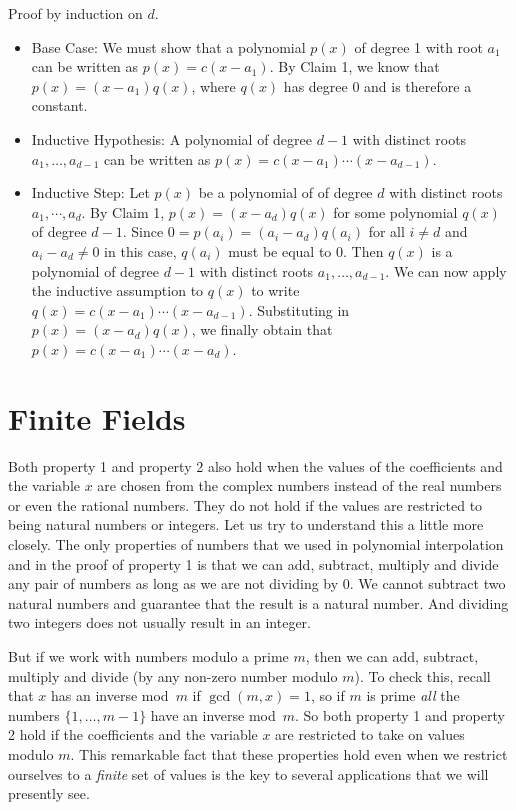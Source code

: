 \documentclass[11pt,fleqn]{article}
\begin{document}
Proof by induction on $d$.  
\begin{itemize}
\item Base Case: We must show that a polynomial $p(x)$ of degree 1 with root $a_1$ can be written as $p(x)
 = c(x-a_1)$. By Claim 1, we know that
$p(x) = (x-a_1)q(x)$, where $q(x)$ has degree 0 and is therefore a constant. 
\item Inductive Hypothesis: A polynomial of degree $d-1$ with distinct roots $a_1,\dots,a_{d-1}$ can 
be written as $p(x) = c(x-a_1)\cdots(x - a_{d-1})$. 
\item Inductive Step: Let $p(x)$ be a polynomial of of degree $d$ with distinct roots
$a_1,\cdots,a_d$. By Claim 1, $p(x) = (x-a_d)q(x)$ for some polynomial $q(x)$ of degree $d-1$. Since $0 = p(a_i) = 
(a_i-a_d)q(a_i)$ for all $i\neq d$  and $a_i-a_d \neq 0$ in this case, $q(a_i)$ must be equal 
to 0. Then $q(x)$ is a polynomial of degree
$d-1$ with distinct roots $a_1,\dots,a_{d-1}$. We can
now apply the inductive assumption to $q(x)$ to write $q(x) = c(x-a_1)\cdots(x - a_{d-1})$. 
Substituting in $p(x) = (x-a_d)q(x)$, we finally obtain that 
$p(x) = c(x-a_1)\cdots(x-a_d)$.  
\end{itemize}


\section*{Finite Fields}

Both property 1 and property 2 also hold when the values of the 
coefficients and the variable $x$ are chosen from the complex 
numbers instead of the real numbers or even the rational numbers. 
They do not hold if the values are restricted to being natural 
numbers or integers. Let us try to understand this a little more 
closely. The only properties of numbers that we used in polynomial 
interpolation and in the proof of property 1 is that we can 
add, subtract, multiply and divide any pair of numbers as long
as we are not dividing by $0$. We cannot subtract two natural 
numbers and guarantee that the result is a natural number. And 
dividing two integers does not usually result in an integer. 

But if we work with numbers modulo a prime $m$, then we can 
add, subtract, multiply and divide (by any non-zero number modulo $m$).
To check this, recall that $x$ has an inverse mod~$m$ if $\gcd(m,x)=1$,
so if $m$ is prime {\it all\/} the numbers $\{1,\ldots,m-1\}$
have an inverse mod~$m$.
So both property 1 and property 2 hold if the coefficients and 
the variable $x$ are restricted to take on values modulo $m$. 
This remarkable fact that these properties hold even when we 
restrict ourselves to a {\em finite} set of values is the key to
several applications that we will presently see. 
\end{document}
